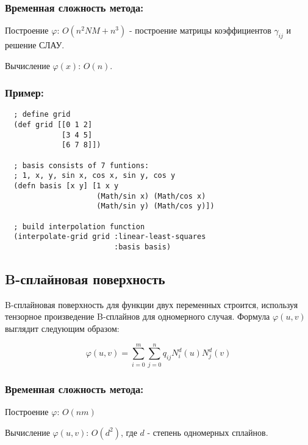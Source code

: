 \subsubsection{Временная сложность метода:}

Построение $\varphi$: $ O(n^2NM + n^3)$ - построение матрицы коэффициентов $\gamma_{ij}$ и решение СЛАУ.

Вычисление $\varphi(x)$: $O(n)$.

\subsubsection{Пример:}

\begin{verbatim}
  ; define grid
  (def grid [[0 1 2]
             [3 4 5]
             [6 7 8]])

  ; basis consists of 7 funtions:
  ; 1, x, y, sin x, cos x, sin y, cos y
  (defn basis [x y] [1 x y
                     (Math/sin x) (Math/cos x)
                     (Math/sin y) (Math/cos y)])

  ; build interpolation function
  (interpolate-grid grid :linear-least-squares
                         :basis basis)
\end{verbatim}



\subsection{B-сплайновая поверхность}

B-сплайновая поверхность для функции двух переменных строится, используя тензорное произведение B-сплайнов для одномерного случая. Формула $\varphi(u, v)$ выглядит следующим образом:

\begin{equation}
  \varphi(u, v) = \sum_{i=0}^m \sum_{j=0}^n q_{ij} N^d_i(u)N^d_j(v)
\end{equation}

\subsubsection{Временная сложность метода:}

Построение $\varphi$: $O(n m)$

Вычисление $\varphi(u, v)$: $O(d^2)$, где $d$ - степень одномерных сплайнов.

